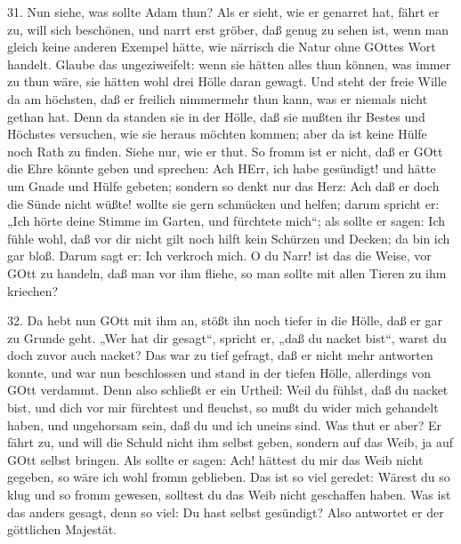 31. Nun siehe, was sollte Adam thun? Als er sieht, wie er genarret hat, fährt er zu, will sich beschönen, und narrt erst gröber, daß genug zu sehen ist, wenn man gleich keine anderen Exempel hätte, wie närrisch die Natur ohne GOttes Wort handelt. Glaube das ungeziweifelt: wenn sie hätten alles thun können, was immer zu thun wäre, sie hätten wohl drei Hölle daran gewagt. Und steht der freie Wille da
am höchsten, daß er freilich nimmermehr thun kann, was er niemals nicht gethan hat. Denn da standen sie in der Hölle, daß sie mußten ihr Bestes und Höchstes versuchen, wie sie heraus möchten kommen; aber da ist keine Hülfe noch Rath zu finden. Siehe nur, wie er thut. So fromm ist er nicht, daß er GOtt die Ehre könnte geben und sprechen: Ach HErr, ich habe gesündigt! und hätte um Gnade und Hülfe gebeten; sondern so denkt nur das Herz: Ach daß er doch die Sünde nicht wüßte! wollte sie gern schmücken und helfen; darum spricht er: „Ich hörte deine Stimme im Garten, und fürchtete mich“; als sollte er sagen: Ich fühle wohl, daß vor dir nicht gilt noch hilft kein Schürzen und Decken; da bin ich gar bloß. Darum sagt er: Ich verkroch mich. O du Narr! ist das die Weise, vor GOtt zu handeln, daß man vor ihm fliehe, so man sollte mit allen Tieren zu ihm kriechen?

32. Da hebt nun GOtt mit ihm an, stößt ihn noch tiefer in die Hölle, daß er gar zu Grunde geht. „Wer hat dir gesagt“, spricht er, „daß du nacket bist“, warst du doch zuvor auch nacket? Das war zu tief gefragt, daß er nicht mehr antworten konnte, und war nun beschlossen und stand in der tiefen Hölle, allerdings von GOtt verdammt. Denn also schließt er ein Urtheil: Weil du fühlst, daß du nacket bist, und dich vor mir fürchtest und fleuchst, so mußt du wider mich gehandelt haben, und ungehorsam sein, daß du und ich uneins sind. Was thut er aber? Er fährt zu, und will die Schuld nicht ihm selbst geben, sondern auf das Weib, ja auf GOtt selbst bringen. Als sollte er sagen: Ach! hättest du mir das Weib nicht gegeben, so wäre ich wohl fromm geblieben. Das ist so viel geredet: Wärest du so klug und so fromm gewesen, solltest du das Weib nicht geschaffen haben. Was ist das anders gesagt, denn so viel: Du hast selbst gesündigt? Also antwortet er der göttlichen Majestät.

